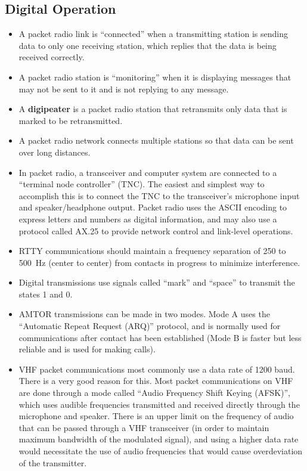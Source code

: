 \documentclass[letterpaper,12pt]{scrartcl}
\begin{document}
\subsection{Digital Operation}

\begin{itemize}
\item A packet radio link is ``connected'' when a transmitting station is sending data to only one receiving station, which replies
that the data is being received correctly.
\item A packet radio station is ``monitoring'' when it is displaying messages that may not be sent to it and is not replying to any message.
\item A \textbf{digipeater} is a packet radio station that retransmits only data that is marked to be retransmitted.
\item A packet radio network connects multiple stations so that data can be sent over long distances.
\item In packet radio, a transceiver and computer system are connected to a ``terminal node controller'' (TNC).
The easiest and simplest way to accomplish this is to connect the TNC to the transceiver's microphone input and speaker/headphone output.
Packet radio uses the ASCII encoding to express letters and numbers as digital information, and may also use a protocol called AX.25
to provide network control and link-level operations.
\item RTTY communications should maintain a frequency separation of 250 to 500~Hz (center to center) from contacts in progress to minimize interference.
\item Digital transmissions use signals called ``mark'' and ``space'' to transmit the states 1 and 0.
\item AMTOR transmissions can be made in two modes. Mode A uses the ``Automatic Repeat Request (ARQ)'' protocol, and is normally used for
communications after contact has been established (Mode B is faster but less reliable and is used for making calls).
\item VHF packet communications most commonly use a data rate of 1200 baud. There is a very good reason for this. 
Most packet communications on VHF are done through a mode called ``Audio Frequency Shift Keying (AFSK)'', which
uses audible frequencies transmitted and received directly through the microphone and speaker. There is an upper limit on the frequency of audio that can be passed
through a VHF transceiver (in order to maintain maximum bandwidth of the modulated signal), and using a higher data rate would necessitate
the use of audio frequencies that would cause overdeviation of the transmitter.
\end{itemize}
\end{document}
